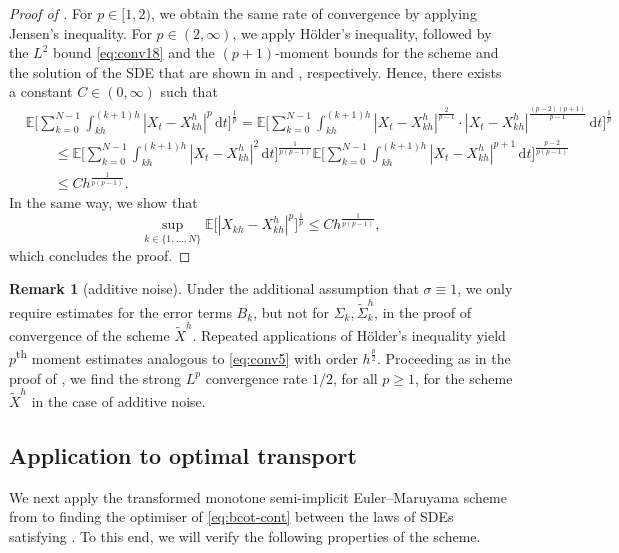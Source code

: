 \documentclass[onseside, final]{amsart}
\theoremstyle{definition}
\newtheorem{remark}[theorem]{Remark}
\newcommand{\E}{\mathbb E}
\newcommand{\D}{\,\mathrm{d}}
\numberwithin{equation}{section}
\begin{document}
\begin{proof}[Proof of ]
			For $p \in [1, 2)$, we obtain the same rate of convergence by applying Jensen's inequality.
			For $p \in (2, \infty)$, we apply H\"older's inequality, followed by the $L^2$ bound \eqref{eq:conv18} and the $(p+1)$-moment bounds for the scheme and the solution of the SDE that are shown in  and , respectively. Hence, there exists a constant $C \in (0, \infty)$ such that
			\begin{equation}
				\begin{split}
					& \E\Biggl[\sum_{k = 0}^{N - 1} \int_{kh}^{(k+1)h}|X_t - X^h_{kh}|^p\D t\Biggr]^{\frac 1p} = \E\Biggl[\sum_{k = 0}^{N - 1} \int_{kh}^{(k+1)h}|X_t - X^h_{kh}|^{\frac {2}{p - 1}} \cdot |X_t - X^h_{kh}|^{\frac{(p - 2)(p + 1)}{p - 1}}\D t\Biggr]^{\frac 1p}\\
					& \qquad \leq \E\Biggl[\sum_{k = 0}^{N - 1} \int_{kh}^{(k+1)h}|X_t - X^h_{kh}|^2\D t\Biggr]^{\frac{1}{p(p - 1)}} \E\Biggl[\sum_{k = 0}^{N - 1} \int_{kh}^{(k+1)h}|X_t - X^h_{kh}|^{p + 1}\D t\Biggr]^{\frac{p - 2}{p(p - 1)}}\\
					& \qquad \leq C h^{\frac{1}{p(p - 1)}}.
				\end{split}
			\end{equation}
			In the same way, we show that
			\begin{equation}
				\sup_{k \in \{1, \dotsc, N\}}\mathbb{E}\bigl[|X_{kh}- X^h_{kh}|^{p}\bigr]^{\frac1p} \leq C h^{\frac{1}{p(p - 1)}},
			\end{equation}
			which concludes the proof.
		\end{proof}
		
		\begin{remark}[additive noise]\label{rem:additive-noise}
			Under the additional assumption that $\sigma \equiv 1$, we only require estimates for the error terms $B_{k}$, but not for $\Sigma_k, \tilde \Sigma^h_k$, in the proof of convergence of the scheme $\tilde X^h$. Repeated applications of H\"older's inequality yield $p$\textsuperscript{th} moment estimates analogous to \eqref{eq:conv5} with order $h^{\frac p2}$. Proceeding as in the proof of , we find the strong $L^p$ convergence rate $1/2$, for all $p \geq 1$, for the scheme $\tilde X^h$ in the case of additive noise.
		\end{remark}
		
	\subsection{Application to optimal transport}\label{sec:bcot-growth-disc}
		We next apply the transformed monotone semi-implicit Euler--Maruyama scheme from  to finding the optimiser of \eqref{eq:bcot-cont} between the laws of SDEs satisfying . To this end, we will verify the following properties of the scheme.
		
\end{document}

